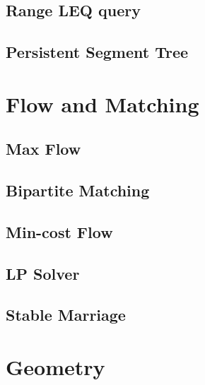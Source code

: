 \subsection{Range LEQ query}
\raggedbottom
\hrulefill
\subsection{Persistent Segment Tree}
\raggedbottom
\hrulefill

\section{Flow and Matching}
\subsection{Max Flow}
\raggedbottom
\hrulefill
\subsection{Bipartite Matching}
\raggedbottom
\hrulefill
\subsection{Min-cost Flow}
\raggedbottom
\hrulefill
\subsection{LP Solver}
\raggedbottom
\hrulefill
\subsection{Stable Marriage}
\raggedbottom
\hrulefill

\section{Geometry}
